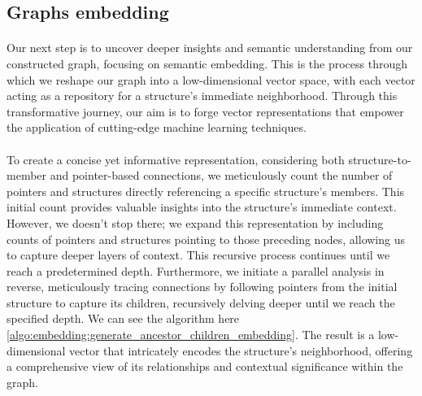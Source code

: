     \subsection{Graphs embedding}

    \paragraph{}Our next step is to uncover deeper insights and semantic understanding from our constructed graph, focusing on semantic embedding. This is the process through which we reshape our graph into a low-dimensional vector space, with each vector acting as a repository for a \gls{structure}'s immediate neighborhood. Through this transformative journey, our aim is to forge vector representations that empower the application of cutting-edge machine learning techniques.

    \paragraph{}To create a concise yet informative representation, considering both structure-to-member and pointer-based connections, we meticulously count the number of \glspl{pointer} and \glspl{structure} directly referencing a specific \gls{structure}'s members. This initial count provides valuable insights into the \gls{structure}'s immediate context. However, we doesn't stop there; we expand this representation by including counts of \glspl{pointer} and \glspl{structure} pointing to those preceding nodes, allowing us to capture deeper layers of context. This recursive process continues until we reach a predetermined depth. Furthermore, we initiate a parallel analysis in reverse, meticulously tracing connections by following \glspl{pointer} from the initial \gls{structure} to capture its children, recursively delving deeper until we reach the specified depth. We can see the algorithm here \ref{algo:embedding:generate_ancestor_children_embedding}. The result is a low-dimensional vector that intricately encodes the \gls{structure}'s neighborhood, offering a comprehensive view of its relationships and contextual significance within the graph.

